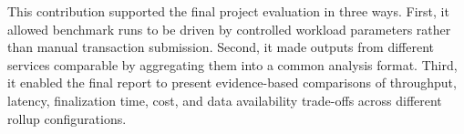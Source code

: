 This contribution supported the final project evaluation in three ways. First, it allowed benchmark runs to be driven by controlled workload parameters rather than manual transaction submission. Second, it made outputs from different services comparable by aggregating them into a common analysis format. Third, it enabled the final report to present evidence-based comparisons of throughput, latency, finalization time, cost, and data availability trade-offs across different rollup configurations.

